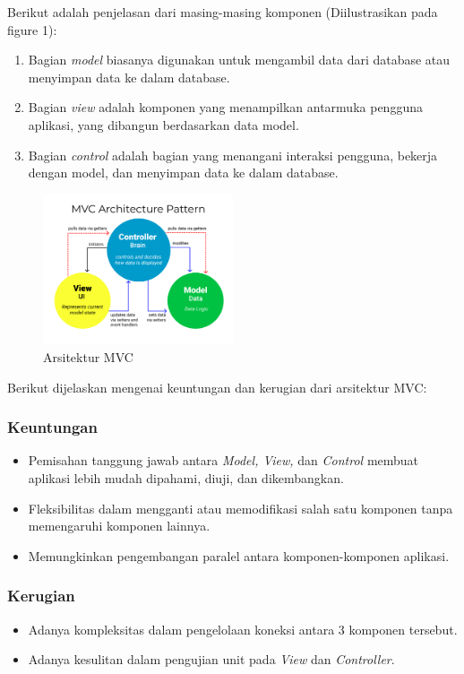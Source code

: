 \documentclass[conference]{IEEEtran}
\begin{document}
	Berikut adalah penjelasan dari masing-masing komponen (Diilustrasikan pada figure 1):
	\begin{enumerate}[label=\alph*]
		\item Bagian \textit{model} biasanya digunakan untuk mengambil data dari database atau menyimpan data ke dalam database. 
		\item Bagian \textit{view} adalah komponen yang menampilkan antarmuka pengguna aplikasi, yang dibangun berdasarkan data model. 
		\item Bagian \textit{control} adalah bagian yang menangani interaksi pengguna, bekerja dengan model, dan menyimpan data ke dalam database.
	\end{enumerate}
	
	\vspace{4.5\baselineskip} 
	
	\begin{figure}
		\centering
		\includegraphics[width=0.5\textwidth]{images/MVC3}
		\caption{Arsitektur MVC}
	\end{figure}
	
	Berikut dijelaskan mengenai keuntungan dan kerugian dari arsitektur MVC:
	\subsubsection{Keuntungan}
	\begin{itemize}
		\item Pemisahan tanggung jawab antara \textit{Model, View,} dan \textit{Control} membuat aplikasi lebih mudah dipahami, diuji, dan dikembangkan.
		\item Fleksibilitas dalam mengganti atau memodifikasi salah satu komponen tanpa memengaruhi komponen lainnya.
		\item Memungkinkan pengembangan paralel antara komponen-komponen aplikasi.
	\end{itemize}
	\subsubsection{Kerugian}
	\begin{itemize}
		\item Adanya kompleksitas dalam pengelolaan koneksi antara 3 komponen tersebut.
		\item Adanya kesulitan dalam pengujian unit pada \textit{View} dan \textit{Controller}.
	\end{itemize}
	
\end{document}
